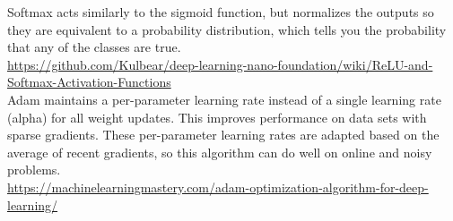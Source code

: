 \documentclass[11pt]{article}
\begin{document}
Softmax acts similarly to the sigmoid function, but normalizes the outputs so they are equivalent to a probability distribution, which tells you the probability that any of the classes are true. \\
\url{https://github.com/Kulbear/deep-learning-nano-foundation/wiki/ReLU-and-Softmax-Activation-Functions} \\

Adam maintains a per-parameter learning rate instead of a single learning rate (alpha) for all weight updates. This improves performance on data sets with sparse gradients. These per-parameter learning rates are adapted based on the average of recent gradients, so this algorithm can do well on online and noisy problems. \\
\url{https://machinelearningmastery.com/adam-optimization-algorithm-for-deep-learning/}
\end{document}

